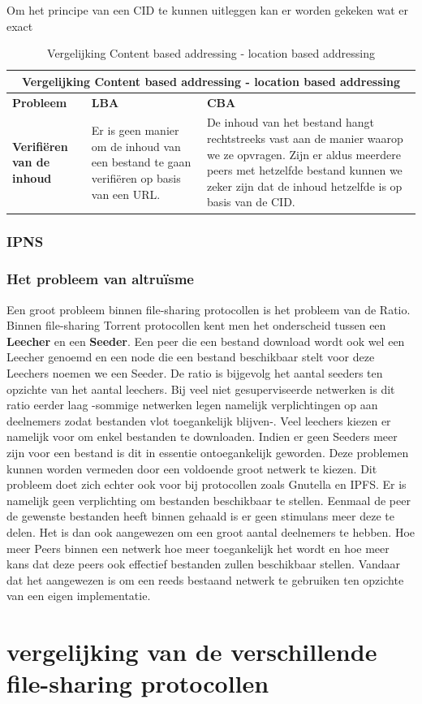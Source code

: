 Om het principe van een CID te kunnen uitleggen kan er worden gekeken wat er exact

\begin{table}[h!]
	\centering
	\begin{tabular}{ |p{3cm}|p{6cm}|p{6cm}|}
		\hline
		\multicolumn{3}{|c|}{Vergelijking Content based addressing - location based addressing}\\
		\hline
		\textbf{Probleem}&\textbf{LBA}&\textbf{CBA}\\
		\hline
		\textbf{Verifiëren van de inhoud}&Er is geen manier om de inhoud van een bestand te gaan verifiëren op basis van een URL.&De inhoud van het bestand hangt rechtstreeks vast aan de manier waarop we ze opvragen. Zijn er aldus meerdere peers met hetzelfde bestand kunnen we zeker zijn dat de inhoud hetzelfde is op basis van de CID.
		
	\end{tabular}
	\caption{Vergelijking Content based addressing - location based addressing}
\end{table}

\subsubsection{IPNS}
\label{ipns}

\subsubsection{Het probleem van altruïsme}
Een groot probleem binnen file-sharing protocollen is het probleem van de Ratio. Binnen file-sharing Torrent protocollen kent men het onderscheid tussen een \textbf{Leecher} en een \textbf{Seeder}. Een peer die een bestand download wordt ook wel een Leecher genoemd en een node die een bestand beschikbaar stelt voor deze Leechers noemen we een Seeder. De ratio is bijgevolg het aantal seeders ten opzichte van het aantal leechers. Bij veel niet gesuperviseerde netwerken is dit ratio eerder laag -sommige netwerken legen namelijk verplichtingen op aan deelnemers zodat bestanden vlot toegankelijk blijven-. Veel leechers kiezen er namelijk voor om enkel bestanden te downloaden. Indien er geen Seeders meer zijn voor een bestand is dit in essentie ontoegankelijk geworden. Deze problemen kunnen worden vermeden door een voldoende groot netwerk te kiezen. Dit probleem doet zich echter ook voor bij protocollen zoals Gnutella en IPFS. Er is namelijk geen verplichting om bestanden beschikbaar te stellen. Eenmaal de peer de gewenste bestanden heeft binnen gehaald is er geen stimulans meer deze te delen. Het is dan ook aangewezen om een groot aantal deelnemers te hebben. Hoe meer Peers binnen een netwerk hoe meer toegankelijk het wordt en hoe meer kans dat deze peers ook effectief bestanden zullen beschikbaar stellen. Vandaar dat het aangewezen is om een reeds bestaand netwerk te gebruiken ten opzichte van een eigen implementatie.\\
\section{vergelijking van de verschillende file-sharing protocollen}
\label{vergelijking-FS}

